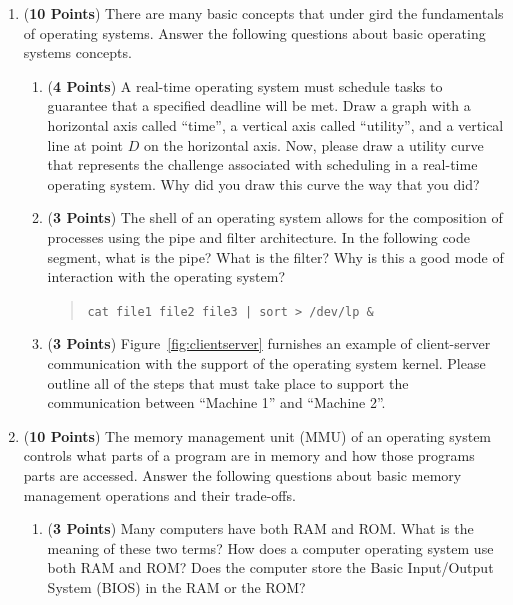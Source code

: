 \documentclass[12pt,epsf,psfig,graphics]{article}
\begin{document}
\begin{enumerate}
\item ({\bf 10 Points}) There are many basic concepts that under gird the fundamentals of operating systems.  Answer the
  following questions about basic operating systems concepts.

  \begin{enumerate}
          
  \item ({\bf 4 Points}) A real-time operating system must schedule tasks to guarantee that a specified deadline will be
    met.  Draw a graph with a horizontal axis called ``time'', a vertical axis called ``utility'', and a vertical line
    at point $D$ on the horizontal axis.  Now, please draw a utility curve that represents the challenge associated with
    scheduling in a real-time operating system. Why did you draw this curve the way that you did?

  \item ({\bf 3 Points}) The shell of an operating system allows for the composition of processes using the pipe and
    filter architecture.  In the following code segment, what is the pipe? What is the filter? Why is this a good mode
    of interaction with the operating system?

    \begin{quote}
      {\tt cat file1 file2 file3 | sort > /dev/lp \&}
    \end{quote}

  \item ({\bf 3 Points}) Figure~\ref{fig:clientserver} furnishes an example of client-server communication with the
    support of the operating system kernel. Please outline all of the steps that must take place to support the
    communication between ``Machine 1'' and ``Machine 2''. 

  \end{enumerate}

  \newpage

\item ({\bf 10 Points}) The memory management unit (MMU) of an operating system controls what parts of a program are in
  memory and how those programs parts are accessed.  Answer the following questions about basic memory management
  operations and their trade-offs.
  
  \begin{enumerate}

    \item ({\bf 3 Points}) Many computers have both RAM and ROM.  What is the meaning of these two terms?  How does a
      computer operating system use both RAM and ROM? Does the computer store the Basic Input/Output System (BIOS) in
      the RAM or the ROM?


\end{enumerate}
\end{enumerate}
\end{document}

